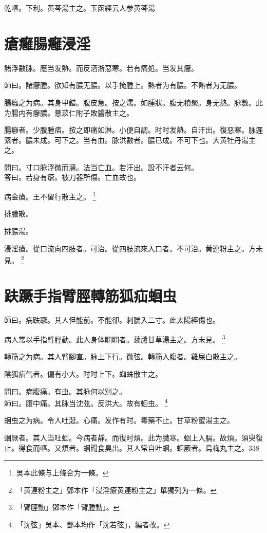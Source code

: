 乾嘔。下利。黄芩湯主之。{\scriptsize 玉函經云人参黄芩湯}

\chapter{瘡癰腸癰浸淫}

諸浮數脉。應当发熱。而反洒淅惡寒。若有痛処。当发其癰。

師曰。諸癰腫。欲知有膿无膿。以手掩腫上。熱者为有膿。不熱者为无膿。

腸癰之为病。其身甲錯。腹皮急。按之濡。如腫狀。腹无積聚。身无熱。脉數。此为腸内有{\khaaitp 癰}膿。薏苡{\khaaitp 仁}附子敗醬散主之。

腸癰者。少腹腫痞。按之即痛如淋。小便自調。时时发熱。自汗出。復惡寒。脉遲緊者。膿未成。可下之。当有血。脉洪數者。膿已成。不可下也。大黄牡丹湯主之。

問曰。寸口脉浮微而濇。法当亡血。若汗出。設不汗者云何。\\
答曰。若身有瘡。被刀器所傷。亡血故也。

病金瘡。王不留行散主之。
	\footnote{吳本此條与上條合为一條。}

排膿散。

排膿湯。

浸淫瘡。從口流向四肢者。可治。從四肢流來入口者。不可治。黄連粉主之。{\scriptsize 方未見。}
	\footnote{「黄連粉主之」鄧本作「浸淫瘡黄連粉主之」單獨列为一條。}

\chapter{趺蹶手指臂脛轉筋狐疝蛔虫}

師曰。病趺蹶。其人但能前。不能卻。刺腨入二寸。此太陽經傷也。

病人常以手指臂脛動。此人身体瞤瞤者。藜蘆甘草湯主之。{\scriptsize 方未見。}
	\footnote{
		「臂脛動」鄧本作「臂腫動」。
	}

轉筋之为病。其人臂腳直。脉上下行。微弦。轉筋入腹者。雞屎白散主之。

陰狐疝气者。偏有小大。时时上下。蜘蛛散主之。

問曰。病腹痛。有虫。其脉何以別之。\\
師曰。腹中痛。其脉当沈弦。反洪大。故有蛔虫。
	\footnote{「沈弦」吳本、鄧本均作「沈若弦」，編者改。}

蛔虫之为病。令人吐涎。心痛。发作有时。毒藥不止。甘草粉蜜湯主之。

蛔厥者。其人当吐蛔。今病者靜。而復时煩。此为臓寒。蛔上入膈。故煩。須臾復止。得食而嘔。又煩者。蛔聞食臭出。其人常自吐蛔。蛔厥者。烏梅丸主之。338


